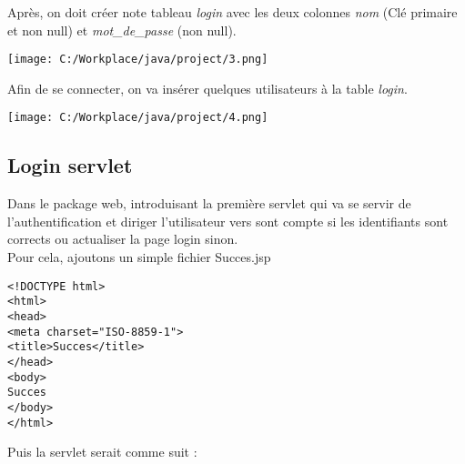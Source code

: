 \documentclass[12]{article}
\begin{document}
Après, on doit créer note tableau \textit{login} avec les deux colonnes \textit{nom} (Clé primaire et non null) et \textit{mot\_de\_passe} (non null).\\

\begin{center}
\texttt{[image: C:/Workplace/java/project/3.png]}
\end{center}

Afin de se connecter, on va insérer quelques utilisateurs à la table \textit{login}.\\


\begin{center}
\texttt{[image: C:/Workplace/java/project/4.png]}
\end{center}






\subsection{Login servlet}

Dans le package web, introduisant la première servlet qui va se servir de l'authentification et diriger l'utilisateur vers sont compte si les identifiants sont corrects ou actualiser la page login sinon.\\

Pour cela, ajoutons un simple fichier Succes.jsp \\

\lstset{language=XML}
\begin{lstlisting}
<!DOCTYPE html>
<html>
<head>
<meta charset="ISO-8859-1">
<title>Succes</title>
</head>
<body>
Succes
</body>
</html>
\end{lstlisting}


\newpage

Puis la servlet serait comme suit :\\
\end{document}
